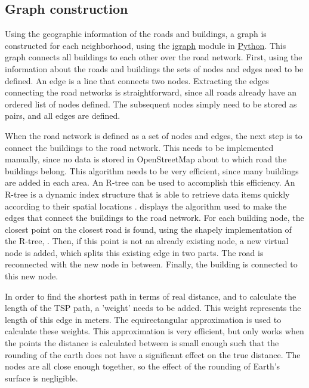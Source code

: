 \subsection{Graph construction}
Using the geographic information of the roads and buildings, a graph is constructed for each neighborhood, using the \url{igraph} \citep{igraph} module in \url{Python}.
This graph connects all buildings to each other over the road network.
First, using the information about the roads and buildings the sets of nodes and edges need to be defined.
An edge is a line that connects two nodes.
Extracting the edges connecting the road networks is straightforward, since all roads already have an ordered list of nodes defined.
The subsequent nodes simply need to be stored as pairs, and all edges are defined.

When the road network is defined as a set of nodes and edges, the next step is to connect the buildings to the road network.
This needs to be implemented manually, since no data is stored in OpenStreetMap about to which road the buildings belong.
This algorithm needs to be very efficient, since many buildings are added in each area.
An R-tree can be used to accomplish this efficiency.
An R-tree is a dynamic index structure that is able to retrieve data items quickly according to their spatial locations \citep{guttman1984r}.
 displays the algorithm used to make the edges that connect the buildings to the road network.
For each building node, the closest point on the closest road is found, using the shapely \citep{shapely} implementation of the R-tree, .
Then, if this point is not an already existing node, a new virtual node is added, which splits this existing edge in two parts.
The road is reconnected with the new node in between.
Finally, the building is connected to this new node.

In order to find the shortest path in terms of real distance, and to calculate the length of the
TSP path, a 'weight' needs to be added. This weight represents the length of this edge in meters.
The equirectangular approximation is used to calculate these weights. This approximation is very
efficient, but only works when the points the distance is calculated between is small enough such
that the rounding of the earth does not have a significant effect on the true distance.
The nodes are all close enough together, so the effect of the
rounding of Earth's surface is negligible.

